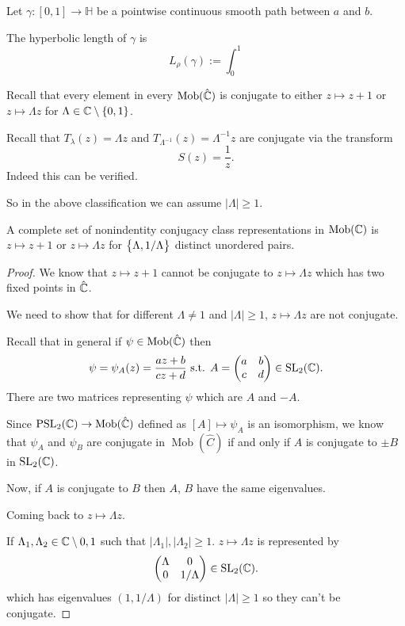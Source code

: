 \documentclass[11pt,a4paper]{article}
\renewcommand{\H}{\mathbb H}
\DeclareMathOperator{\Mob}{Mob}
\begin{document}
\begin{definition}[Length]
  Let $\gamma \colon [0,1] \to \H$ be a pointwise continuous smooth path
  between $a$ and $b$.

  The hyperbolic length of $\gamma$ is
  \[
    L_{\rho}(\gamma) :=
    \int_0^1 
  \]
\end{definition}


Recall that every element in every $\Mob(\hat \C)$ is conjugate
to either $z \mapsto z + 1$ or $z \mapsto \Lambda z$ for
$\Lambda \in \mathbb{C} \setminus \left\{0,1\right\}$.

Recall that $T_{\lambda}(z)= \Lambda z$ and
$T_{\Lambda^{-1}}(z) = \Lambda^{-1} z$ are conjugate via the transform
\[
  S(z) = \frac{1}{z}.
\]
Indeed this can be verified.

So in the above classification we can assume $|\Lambda| \geq 1$.

\begin{corollary}
  A complete set of nonindentity conjugacy class representations in $\Mob(\C)$
  is $z \mapsto z + 1$ or $z \mapsto \Lambda z$ for $\left\{\Lambda, 1 / \Lambda\right\}$
  distinct unordered pairs.
\end{corollary}
\begin{proof}
  We know that $z \mapsto z + 1$ cannot be conjugate to $z \mapsto \Lambda z$
  which has two fixed points in $\hat {\mathbb{C}}$.

  We need to show that for different $\Lambda \neq 1$ and $|\Lambda| \geq 1$,
  $z \mapsto \Lambda z$ are not conjugate.

  Recall that in general if $\psi \in \Mob(\hat \C)$ then
  \[
    \psi = \psi_A(z) = \frac{a z + b}{c z + d} \text{ s.t. }
    A =
    \begin{pmatrix}
      a & b \\
      c & d
    \end{pmatrix} \in \mathrm{SL}_2(\mathbb{C}).
  \]
  There are two matrices representing $\psi$ which are $A$ and $-A$.

  Since $\PSL_2(\C) \to \Mob(\hat \C)$ defined as $[A] \mapsto \psi_A$
  is an isomorphism, we know that $\psi_A$ and $\psi_B$ are conjugate
  in $\Mob(\hat C)$ if and only if $A$ is conjugate to $\pm B$ in
  $\mathrm{SL}_2(\mathbb{C})$.

  Now, if $A$ is conjugate to $B$ then $A$, $B$ have the same eigenvalues.

  Coming back to $z \mapsto \Lambda z$.

  If $\Lambda_1, \Lambda_2 \in \mathbb{C} \setminus{0,1}$ such that
  $|\Lambda_1|, |\Lambda_2| \geq 1$. $z \mapsto \Lambda z$ is represented
  by
  \[
    \begin{pmatrix}
      \Lambda & 0 \\
      0 & 1 / \Lambda
    \end{pmatrix} \in \mathrm{SL}_2(\mathbb{C}).
  \]
  which has eigenvalues $(1, 1 / \Lambda)$ for distinct $|\Lambda| \geq 1$
  so they can't be conjugate.
\end{proof}
\end{document}
